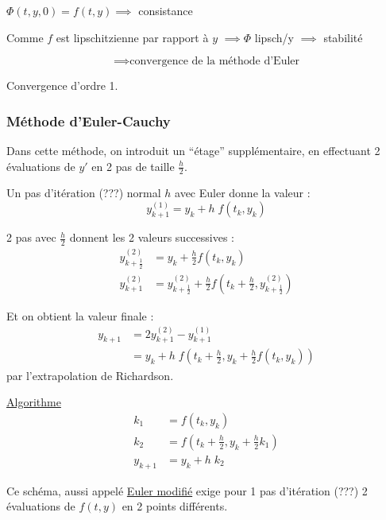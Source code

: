 $\Phi(t,y,0) = f(t,y) \implies$ consistance

Comme $f$ est lipschitzienne par rapport à $y$ $\implies \Phi$ lipsch/y $\implies$ stabilité

\[
    \implies \text{convergence de la méthode d'Euler}
\]

Convergence d'ordre 1.

\subsubsection*{Méthode d'Euler-Cauchy}

Dans cette méthode, on introduit un ``étage'' supplémentaire, en effectuant 2 évaluations de
$y'$ en 2 pas de taille $\frac{h}{2}$.

Un pas d'itération (???) normal $h$ avec Euler donne la valeur :
\[
    y_{k+1}^{(1)} = y_k + h \; f(t_k,y_k)
\]

2 pas avec $\frac{h}{2}$ donnent les 2 valeurs successives :
\begin{align*}
    y_{k+\frac{1}{2}}^{(2)} & = y_k + \frac{h}{2} f(t_k,y_k) \\
    y_{k+1}^{(2)} & = y_{k+\frac{1}{2}}^{(2)} + \frac{h}{2} f(t_k+ \frac{h}{2}, y_{k+\frac{1}{2}}^{(2)})
\end{align*}

Et on obtient la valeur finale :
\begin{align*}
    y_{k+1} & = 2 y_{k+1}^{(2)} - y_{k+1}^{(1)} \\
    & = y_k + h \; f(t_k + \frac{h}{2}, y_k + \frac{h}{2} f(t_k,y_k))
\end{align*}
par l'extrapolation de Richardson.

\underline{Algorithme}
\[
    \boxed{\begin{aligned}
        k_1 & = f(t_k,y_k) \\
        k_2 & = f(t_k + \frac{h}{2}, y_k + \frac{h}{2}k_1) \\
        y_{k+1} & = y_k + h \; k_2
    \end{aligned}}
\]

Ce schéma, aussi appelé \underline{Euler modifié} exige pour 1 pas d'itération (???) 2 évaluations de $f(t,y)$ en 2 points différents.

